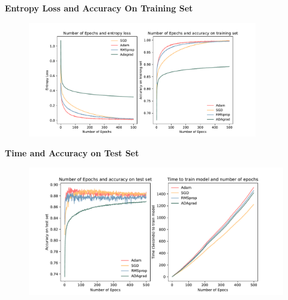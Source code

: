 \documentclass{beamer}
\newcommand\myheading[1]{%
  \par\bigskip
  {\Large\bfseries#1}\par\smallskip}
\begin{document}
\begin{frame}
    \myheading{Entropy Loss and Accuracy On Training Set}
    \begin{figure}[h]
        \includegraphics[width=10cm]{report/figures/accuracy_training_and_entropy.pdf}
    \end{figure}
\end{frame}


\begin{frame}
 \myheading{Time and Accuracy on Test Set}
    \begin{figure}[h]
        \includegraphics[width=12cm]{report/figures/time_and_accuracy.pdf}
    \end{figure}
\end{frame}
\begin{frame}
    
\end{frame}
\end{document}
